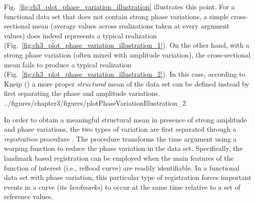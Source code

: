 Fig.~\ref{fig:ch3_plot_phase_variation_illustration} illustrates this point.
For a functional data set that does not contain strong phase variations, 
a simple cross-sectional mean (average values across realizations taken at every argument values) does indeed represents a typical realization (Fig.~\ref{fig:ch3_plot_phase_variation_illustration_1}).
On the other hand, with a strong phase variation (often mixed with amplitude variation), 
the cross-sectional mean fails to produce a typical realization (Fig.~\ref{fig:ch3_plot_phase_variation_illustration_2}).
In this case,
according to Kneip (\cite{Kneip1992}) a more proper \emph{structural} mean of the data set can be defined instead
by first separating the phase and amplitude variations.
{../figures/chapter3/figures/plotPhaseVariationIllustration_2}

In order to obtain a meaningful structural mean in presence of strong amplitude and phase variations,
the two types of variation are first separated through a \emph{registration} procedure \cite{Wang1997,Ramsay1998}.
The procedure transforms the time argument using a warping function to reduce the phase variation in the data set.
Specifically, the landmark based registration can be employed when the main features of the function of interest (i.e., reflood curve) are readily identifiable.
In a functional data set with phase variation, this particular type of registration forces important events in a curve (its \emph{landmarks}) to occur at the same time relative to a set of reference values.

